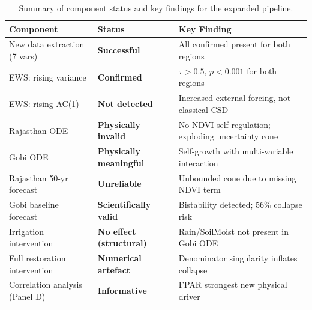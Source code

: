 \documentclass[12pt, a4paper]{article}
\begin{document}
\begin{table}[H]
\centering
\caption{Summary of component status and key findings for the expanded
pipeline.}
\label{tab:expanded_status}
\begin{tabularx}{\textwidth}{p{4.4cm} p{2.8cm} X}
\toprule
\textbf{Component} & \textbf{Status} & \textbf{Key Finding} \\
\midrule
New data extraction (7 vars) &
    \textcolor{notegreen}{\textbf{Successful}} &
    All confirmed present for both regions \\[3pt]
EWS: rising variance &
    \textcolor{notegreen}{\textbf{Confirmed}} &
    $\tau > 0.5$, $p < 0.001$ for both regions \\[3pt]
EWS: rising AC(1) &
    \textcolor{warnred}{\textbf{Not detected}} &
    Increased external forcing, not classical CSD \\[3pt]
Rajasthan ODE &
    \textcolor{warnred}{\textbf{Physically invalid}} &
    No NDVI self-regulation; exploding uncertainty cone \\[3pt]
Gobi ODE &
    \textcolor{notegreen}{\textbf{Physically meaningful}} &
    Self-growth with multi-variable interaction \\[3pt]
Rajasthan 50-yr forecast &
    \textcolor{warnred}{\textbf{Unreliable}} &
    Unbounded cone due to missing NDVI term \\[3pt]
Gobi baseline forecast &
    \textcolor{notegreen}{\textbf{Scientifically valid}} &
    Bistability detected; 56\% collapse risk \\[3pt]
Irrigation intervention &
    \textcolor{warnred}{\textbf{No effect (structural)}} &
    Rain/SoilMoist not present in Gobi ODE \\[3pt]
Full restoration intervention &
    \textcolor{warnred}{\textbf{Numerical artefact}} &
    Denominator singularity inflates collapse \\[3pt]
Correlation analysis (Panel D) &
    \textcolor{notegreen}{\textbf{Informative}} &
    FPAR strongest new physical driver \\
\bottomrule
\end{tabularx}
\end{table}
\end{document}
